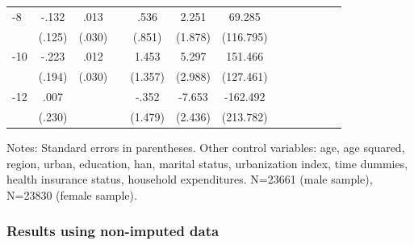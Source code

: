\begin{table}[h]
\begin{adjustbox}{max width=\linewidth}
\begin{threeparttable}
{\begin{tabular}{l*{6}{S
S}}
-8             &    -.132         &     .013         &                  &     .536         &    2.251         &   69.285         \\
                &   (.125)         &   (.030)         &                  &   (.851)         &  (1.878)         &(116.795)         \\
-10            &    -.223         &     .012         &                  &    1.453         &    5.297\sym{*}  &  151.466         \\
                &   (.194)         &   (.030)         &                  &  (1.357)         &  (2.988)         &(127.461)         \\
-12           &     .007         &                  &                  &    -.352         &   -7.653\sym{***}& -162.492         \\
                &   (.230)         &                  &                  &  (1.479)         &  (2.436)         &(213.782)         \\        
\bottomrule
\end{tabular}
\begin{tablenotes}
\item Notes:   Standard errors in parentheses.
Other control variables: age, age squared, region, urban, education, han, marital status, urbanization index, time dummies, health insurance status, household expenditures.  N=23661 (male sample), N=23830 (female sample).
\end{tablenotes}
}
\end{threeparttable}
\end{adjustbox}
\end{table}
\FloatBarrier


\subsubsection*{Results using non-imputed data}

